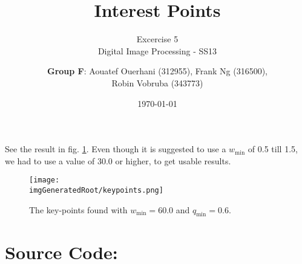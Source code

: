 \documentclass[a4paper,headings=small]{scrartcl}
\title{Interest Points}
\subtitle{Excercise 5 \\ Digital Image Processing - SS13}
\author{\textbf{Group F}: Aouatef Ouerhani (312955), Frank Ng (316500),\\ Robin Vobruba (343773)}
\date{\today}
\numberwithin{equation}{section} %
\numberwithin{figure}{section}   %
\newcommand{\imgGeneratedRoot}{../../../target}
\begin{document}
\maketitle

See the result in fig. \ref{fig:keypoints}.
Even though it is suggested to use a $w_{\text{min}}$ of 0.5 till 1.5,
we had to use a value of 30.0 or higher, to get usable results.

\begin{figure}[ht]
	\centering
	\texttt{[image: \\imgGeneratedRoot/keypoints.png]}
	\caption{
		The key-points found with $w_{\text{min}} = 60.0$ and $q_{\text{min}} = 0.6$.
	}
	\label{fig:keypoints}
\end{figure}


\newpage
\section{Source Code:}


\end{document}
